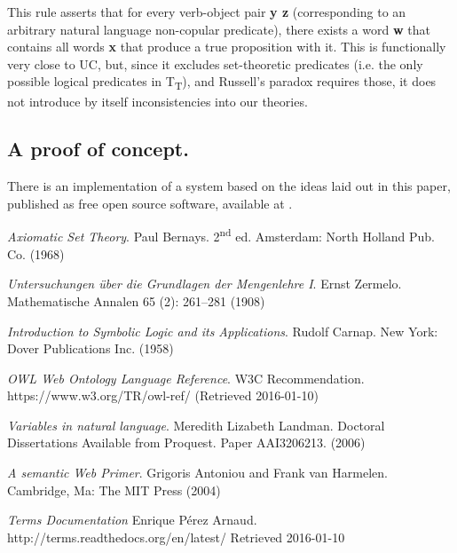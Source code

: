 \documentclass{IOS-Book-Article}     %
\begin{document}
This rule asserts that for every verb-object pair \textbf{y z}
(corresponding to an arbitrary natural language non-copular predicate),
there exists a word \textbf{w} that contains all words \textbf{x} that
produce a true proposition with it. This is
functionally very close to UC, but, since it excludes set-theoretic
predicates (i.e. the only possible logical predicates in T\textsubscript{T}),
and Russell's paradox requires those, it
does not introduce by itself inconsistencies into our theories.

\subsection{A proof of concept.}

There is an implementation of a system based on the ideas laid out in
this paper, published as free open source software, available at \cite{r7}.

\clearpage

\begin{thebibliography}{99}

\textit{Axiomatic Set Theory}. Paul Bernays.
    2\textsuperscript{nd} ed. Amsterdam: North Holland Pub. Co. (1968)

  \textit{Untersuchungen über die Grundlagen der Mengenlehre I}. Ernst Zermelo.
  Mathematische Annalen 65 (2): 261–281 (1908)

  \textit{Introduction to Symbolic Logic and its Applications}. Rudolf Carnap.
    New York: Dover Publications Inc. (1958)

  \textit{OWL Web Ontology Language Reference}. W3C Recommendation.
    https://www.w3.org/TR/owl-ref/ (Retrieved 2016-01-10)

  \textit{Variables in natural language}. Meredith Lizabeth Landman.
  Doctoral Dissertations Available from Proquest. Paper AAI3206213. (2006)

  \textit{A semantic Web Primer}. Grigoris Antoniou and Frank van Harmelen.
    Cambridge, Ma: The MIT Press (2004)

  \textit{Terms Documentation} Enrique P\'erez Arnaud.
  http://terms.readthedocs.org/en/latest/ Retrieved 2016-01-10


\end{thebibliography}
\end{document}
